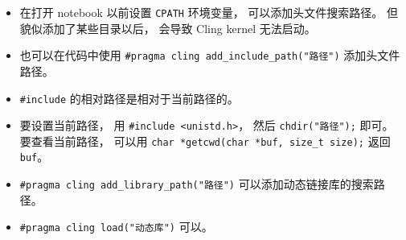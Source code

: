 \begin{itemize}
\item 在打开 notebook 以前设置 \verb|CPATH| 环境变量， 可以添加头文件搜索路径。 但貌似添加了某些目录以后， 会导致 Cling kernel 无法启动。
\item 也可以在代码中使用 \verb|#pragma cling add_include_path("路径")| 添加头文件路径。
\item \verb|#include| 的相对路径是相对于当前路径的。
\item 要设置当前路径， 用 \verb|#include <unistd.h>|， 然后 \verb|chdir("路径");| 即可。 要查看当前路径， 可以用 \verb|char *getcwd(char *buf, size_t size);| 返回 \verb|buf|。
\item \verb|#pragma cling add_library_path("路径")| 可以添加动态链接库的搜索路径。
\item \verb|#pragma cling load("动态库")| 可以。
\end{itemize}
